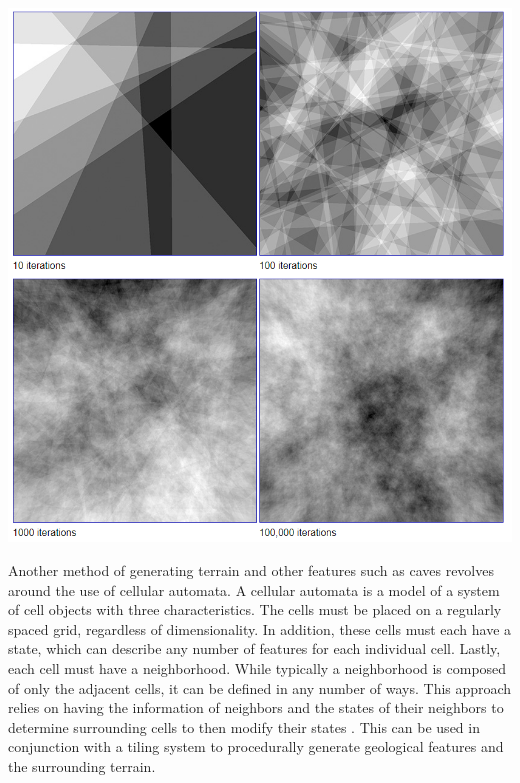 \documentclass[10pt]{report}
\begin{document}
		\begin{minipage}{\textwidth}
			\centering
			\includegraphics[scale=.4]{fractal-noise}
			\label{fig:fractal-land}
		\end{minipage}
		
		Another method of generating terrain and other features such as caves \cite{10.1145/1814256.1814266} revolves around the use of cellular automata. A cellular automata is a model of a system of cell objects with three characteristics. The cells must be placed on a regularly spaced grid, regardless of dimensionality. In addition, these cells must each have a state, which can describe any number of features for each individual cell. Lastly, each cell must have a neighborhood. While typically a neighborhood is composed of only the adjacent cells, it can be defined in any number of ways. This approach relies on having the information of neighbors and the states of their neighbors to determine surrounding cells to then modify their states \cite{nature-of-code}. This can be used in conjunction with a tiling system to procedurally generate geological features and the surrounding terrain.
		
\end{document}
